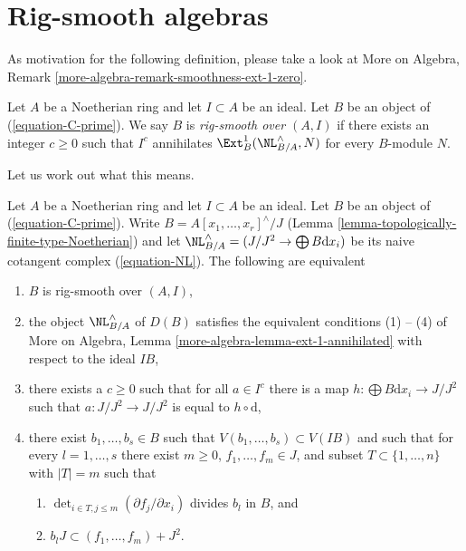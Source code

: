\section{Rig-smooth algebras}
\label{section-rig-smooth}

\noindent
As motivation for the following definition, please take a look at
More on Algebra, Remark \ref{more-algebra-remark-smoothness-ext-1-zero}.

\begin{definition}
\label{definition-rig-smooth-homomorphism}
Let $A$ be a Noetherian ring and let $I \subset A$ be an ideal.
Let $B$ be an object of (\ref{equation-C-prime}). We say
$B$ is {\it rig-smooth over $(A, I)$} if there exists an integer $c \geq 0$
such that $I^c$ annihilates $\Ext^1_B(\NL_{B/A}^\wedge, N)$ for every
$B$-module $N$.
\end{definition}

\noindent
Let us work out what this means.

\begin{lemma}
\label{lemma-equivalent-with-artin-smooth}
Let $A$ be a Noetherian ring and let $I \subset A$ be an ideal.
Let $B$ be an object of (\ref{equation-C-prime}). Write
$B = A[x_1, \ldots, x_r]^\wedge/J$
(Lemma \ref{lemma-topologically-finite-type-Noetherian})
and let $\NL_{B/A}^\wedge = (J/J^2 \to \bigoplus B\text{d}x_i)$
be its naive cotangent complex (\ref{equation-NL}).
The following are equivalent
\begin{enumerate}
\item $B$ is rig-smooth over $(A, I)$,
\item the object $\NL_{B/A}^\wedge$ of $D(B)$ satisfies the equivalent
conditions (1) -- (4) of More on Algebra, Lemma
\ref{more-algebra-lemma-ext-1-annihilated} with respect to the ideal $IB$,
\item there exists a $c \geq 0$ such that for all $a \in I^c$
there is a map $h : \bigoplus B\text{d}x_i \to J/J^2$ such that
$a : J/J^2 \to J/J^2$ is equal to $h \circ \text{d}$,
\item there exist $b_1, \ldots, b_s \in B$ such that
$V(b_1, \ldots, b_s) \subset V(IB)$ and such that for every
$l = 1, \ldots, s$ there exist $m \geq 0$, $f_1, \ldots, f_m \in J$,
and subset $T \subset \{1, \ldots, n\}$ with $|T| = m$ such that
\begin{enumerate}
\item $\det_{i \in T, j \leq m}(\partial f_j/ \partial x_i)$
divides $b_l$ in $B$, and
\item $b_l J \subset (f_1, \ldots, f_m) + J^2$.
\end{enumerate}
\end{enumerate}
\end{lemma}

